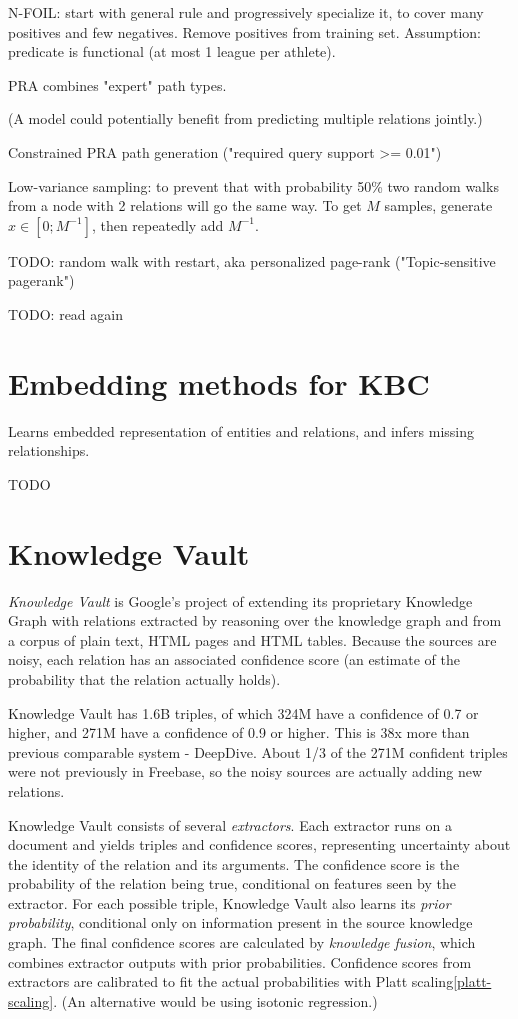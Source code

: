 N-FOIL: start with general rule and progressively specialize it, to cover many
positives and few negatives. Remove positives from training set.
Assumption: predicate is functional (at most 1 league per athlete).

PRA combines "expert" path types.

(A model could potentially benefit from predicting multiple relations jointly.)

Constrained PRA path generation ("required query support >=
0.01")\cite{random-walk-inference}

Low-variance sampling: to prevent that with probability 50\% two random walks
from a node with 2 relations will go the same way. To get $M$ samples, generate
$x\in[0;M^{-1}]$, then repeatedly add $M^{-1}$.

TODO: random walk with restart, aka personalized page-rank ("Topic-sensitive
pagerank")

TODO: read again

\section{Embedding methods for KBC}

Learns embedded representation of entities and relations, and infers missing
relationships.

TODO

\section{Knowledge Vault}

\textit{Knowledge Vault}\cite{knowledge-vault} is Google's project of extending
its proprietary Knowledge Graph with relations extracted by reasoning over
the knowledge graph and from a corpus of plain text, HTML pages and HTML
tables. Because the sources are noisy, each relation has an associated
confidence score (an estimate of the probability that the relation actually
holds).

Knowledge Vault has 1.6B triples, of which 324M have a confidence of 0.7 or
higher, and 271M have a confidence of 0.9 or higher.
This is 38x more than previous comparable system - DeepDive.
About 1/3 of the 271M confident triples were not previously in Freebase, so
the noisy sources are actually adding new relations.

Knowledge Vault consists of several \textit{extractors}. Each extractor runs on a
document and yields triples and confidence scores, representing uncertainty
about the identity of the relation and its arguments. The confidence score is
the probability of the relation being true, conditional on features seen by
the extractor.
For each possible triple, Knowledge Vault also learns its \textit{prior
probability}, conditional only on information present in the source knowledge
graph.
The final confidence scores are calculated by \textit{knowledge fusion},
which combines extractor outputs with prior probabilities.
Confidence scores from extractors are calibrated to fit the actual probabilities
with Platt scaling\ref{platt-scaling}.
(An alternative would be using isotonic regression.)

